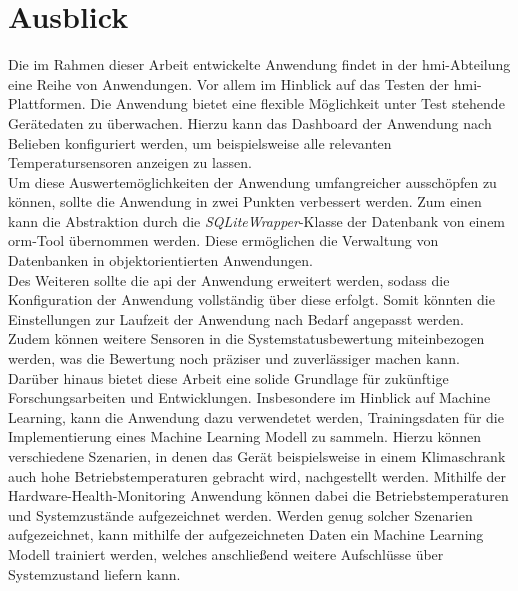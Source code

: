 \chapter{Ausblick}
Die im Rahmen dieser Arbeit entwickelte Anwendung findet in der \ac{hmi}-Abteilung eine Reihe von Anwendungen. Vor allem im Hinblick auf das Testen der \ac{hmi}-Plattformen. Die Anwendung bietet eine flexible Möglichkeit unter Test stehende Gerätedaten zu überwachen. Hierzu kann das Dashboard der Anwendung nach Belieben konfiguriert werden, um beispielsweise alle relevanten Temperatursensoren anzeigen zu lassen.\\
Um diese Auswertemöglichkeiten der Anwendung umfangreicher ausschöpfen zu können, sollte die Anwendung in zwei Punkten verbessert werden. Zum einen kann die Abstraktion durch die \textit{SQLiteWrapper}-Klasse der Datenbank von einem \ac{orm}-Tool übernommen werden. Diese ermöglichen die Verwaltung von Datenbanken in objektorientierten Anwendungen.\cite{ormDB}\\
Des Weiteren sollte die \ac{api} der Anwendung erweitert werden, sodass die Konfiguration der Anwendung vollständig über diese erfolgt. Somit könnten die Einstellungen zur Laufzeit der Anwendung nach Bedarf angepasst werden.\\
Zudem können weitere Sensoren in die Systemstatusbewertung miteinbezogen werden, was die Bewertung noch präziser und zuverlässiger machen kann.\\
Darüber hinaus bietet diese Arbeit eine solide Grundlage für zukünftige Forschungsarbeiten und Entwicklungen. Insbesondere im Hinblick auf Machine Learning, kann die Anwendung dazu verwendetet werden, Trainingsdaten für die Implementierung eines Machine Learning Modell zu sammeln. Hierzu können verschiedene Szenarien, in denen das Gerät beispielsweise in einem Klimaschrank auch hohe Betriebstemperaturen gebracht wird, nachgestellt werden. Mithilfe der Hardware-Health-Monitoring Anwendung können dabei die Betriebstemperaturen und Systemzustände aufgezeichnet werden. Werden genug solcher Szenarien aufgezeichnet, kann mithilfe der aufgezeichneten Daten ein Machine Learning Modell trainiert werden, welches anschließend weitere Aufschlüsse über Systemzustand liefern kann.